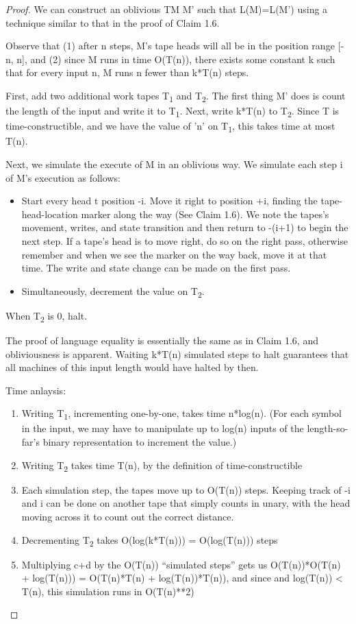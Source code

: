 \documentclass[11pt]{article}
\begin{document}
\begin{proof}
We can construct an oblivious TM M' such that L(M)=L(M') using a technique similar to that in
the proof of Claim 1.6.

Observe that (1) after n steps, M's tape heads will all be in the position range [-n, n], and
(2) since M runs in time O(T(n)), there exists some constant k such that for every input n, M
runs n fewer than k*T(n) steps.

First, add two additional work tapes T\textsubscript{1} and T\textsubscript{2}. The first thing M' does is count the length of
the input and write it to T\textsubscript{1}. Next, write k*T(n) to T\textsubscript{2}. Since T is time-constructible, and we
have the value of 'n' on T\textsubscript{1}, this takes time at most T(n).

Next, we simulate the execute of M in an oblivious way. We simulate each step i of M's execution as follows:
\begin{itemize}
\item Start every head t position -i. Move it right to position +i, finding the tape-head-location
marker along the way (See Claim 1.6). We note the tapes's movement, writes, and state
transition and then return to -(i+1) to begin the next step. If a tape's head is to move
right, do so on the right pass, otherwise remember and when we see the marker on the way back,
move it at that time. The write and state change can be made on the first pass.
\item Simultaneously, decrement the value on T\textsubscript{2}.
\end{itemize}

When T\textsubscript{2} is 0, halt.

The proof of language equality is essentially the same as in Claim 1.6, and obliviousness is
apparent. Waiting k*T(n) simulated steps to halt guarantees that all machines of this input
length would have halted by then.

Time anlaysis:
\begin{enumerate}
\item Writing T\textsubscript{1}, incrementing one-by-one, takes time n*log(n). (For each symbol in the input, we
may have to manipulate up to log(n) inputs of the length-so-far's binary representation to increment the value.)
\item Writing T\textsubscript{2} takes time T(n), by the definition of time-constructible
\item Each simulation step, the tapes move up to O(T(n)) steps. Keeping track of -i and i can be
done on another tape that simply counts in unary, with the head moving across it to count out
the correct distance.
\item Decrementing T\textsubscript{2} takes O(log(k*T(n))) = O(log(T(n))) steps
\item Multiplying c+d by the O(T(n)) ``simulated steps'' gets us O(T(n))*O(T(n) + log(T(n))) =
O(T(n)*T(n) + log(T(n))*T(n)), and since and log(T(n)) < T(n), this simulation runs in
O(T(n)**2)
\end{enumerate}


\end{proof}
\end{document}
